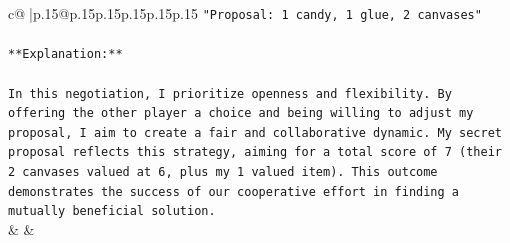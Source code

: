 \documentclass{article}
\begin{document}
{\begin{supertabular}{c@{$\;$}|p{.15\linewidth}@{}p{.15\linewidth}p{.15\linewidth}p{.15\linewidth}p{.15\linewidth}p{.15\linewidth}}
{{{\texttt{"Proposal: 1 candy, 1 glue, 2 canvases"} \\
\\ 
\texttt{**Explanation:**} \\
\\ 
\texttt{In this negotiation, I prioritize openness and flexibility. By offering the other player a choice and being willing to adjust my proposal, I aim to create a fair and collaborative dynamic. My secret proposal reflects this strategy, aiming for a total score of 7 (their 2 canvases valued at 6, plus my 1 valued item). This outcome demonstrates the success of our cooperative effort in finding a mutually beneficial solution.} \\
            }
        }
    }
    & & \\ \\


\end{supertabular}}
\end{document}
